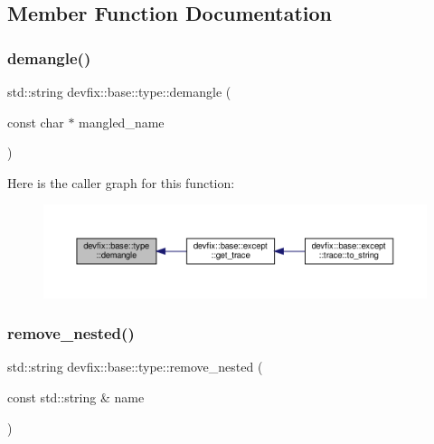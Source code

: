 \subsection{Member Function Documentation}
\mbox{\label{structdevfix_1_1base_1_1type_a51dfa5bc70b1befb7f877ab11ad59215}} 
\subsubsection{\texorpdfstring{demangle()}{demangle()}}
{\footnotesize\ttfamily std\+::string devfix\+::base\+::type\+::demangle (\begin{DoxyParamCaption}\item[{const char $\ast$}]{mangled\+\_\+name }\end{DoxyParamCaption})\hspace{0.3cm}{\ttfamily [static]}}

Here is the caller graph for this function\+:\nopagebreak
\begin{figure}[H]
\begin{center}
\leavevmode
\includegraphics[width=350pt]{structdevfix_1_1base_1_1type_a51dfa5bc70b1befb7f877ab11ad59215_icgraph}
\end{center}
\end{figure}
\mbox{\label{structdevfix_1_1base_1_1type_ab0805a0df723803b9e56a8bd63b64dc8}} 
\subsubsection{\texorpdfstring{remove\+\_\+nested()}{remove\_nested()}}
{\footnotesize\ttfamily std\+::string devfix\+::base\+::type\+::remove\+\_\+nested (\begin{DoxyParamCaption}\item[{const std\+::string \&}]{name }\end{DoxyParamCaption})\hspace{0.3cm}{\ttfamily [static]}}

